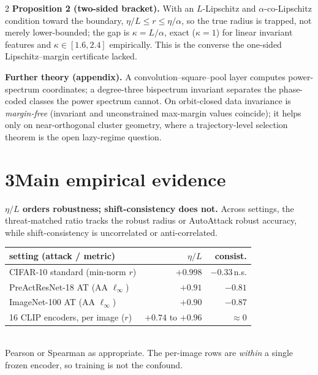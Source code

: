 \documentclass[10pt]{article}
\newcommand{\etaL}{\ensuremath{\eta/L}}
\begin{document}
\begin{multicols}{2}
\textbf{Proposition 2 (two-sided bracket).} With an $L$-Lipschitz and $\alpha$-co-Lipschitz condition toward the boundary, $\eta/L\le r\le\eta/\alpha$, so the true radius is trapped, not merely lower-bounded; the gap is $\kappa=L/\alpha$, exact ($\kappa{=}1$) for linear invariant features and $\kappa\in[1.6,2.4]$ empirically. This is the converse the one-sided Lipschitz--margin certificate lacked.

\textbf{Further theory (appendix).} A convolution--square--pool layer computes power-spectrum coordinates; a degree-three bispectrum invariant separates the phase-coded classes the power spectrum cannot. On orbit-closed data invariance is \emph{margin-free} (invariant and unconstrained max-margin values coincide); it helps only on near-orthogonal cluster geometry, where a trajectory-level selection theorem is the open lazy-regime question.

\section*{3\quad Main empirical evidence}
\textbf{\etaL{} orders robustness; shift-consistency does not.} Across settings, the threat-matched ratio tracks the robust radius or AutoAttack robust accuracy, while shift-consistency is uncorrelated or anti-correlated.

\vspace{2pt}
\begin{tcolorbox}[colback=gray!4,colframe=gray!50,boxrule=0.4pt,arc=2pt,left=3pt,right=3pt,top=2pt,bottom=2pt]
\footnotesize
\begin{tabular}{@{}l@{\ \ }r@{\ \ }r@{}}
\toprule
setting (attack / metric) & \etaL & consist. \\
\midrule
CIFAR-10 standard (min-norm $r$)   & $+0.998$ & $-0.33$\,n.s. \\
PreActResNet-18 AT (AA $\ell_\infty$) & $+0.91$ & $-0.81$ \\
ImageNet-100 AT (AA $\ell_\infty$)    & $+0.90$ & $-0.87$ \\
16 CLIP encoders, per image ($r$)  & $+0.74$ to $+0.96$ & $\approx 0$ \\
\bottomrule
\end{tabular}\\[2pt]
Pearson or Spearman as appropriate. The per-image rows are \emph{within} a single frozen encoder, so training is not the confound.
\end{tcolorbox}
\vspace{1pt}


\end{multicols}
\end{document}
